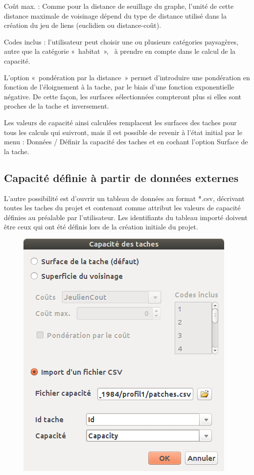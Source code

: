 \documentclass{article}
\begin{document}
Coût max. : Comme pour la distance de seuillage du graphe, l’unité de cette distance maximale de voisinage dépend du type de distance utilisé dans la création du jeu de liens (euclidien ou distance-coût).

Codes inclus : l’utilisateur peut choisir une ou plusieurs catégories paysagères, autre que la catégorie «~habitat~», ~à prendre en compte dans le calcul de la capacité. 

L’option «~pondération par la distance~» permet d’introduire une pondération en fonction de l’éloignement à la tache, par le biais d’une fonction exponentielle négative. De cette façon, les surfaces sélectionnées compteront plus si elles sont proches de la tache et inversement.

Les valeurs de capacité ainsi calculées remplacent les surfaces des taches pour tous les calculs qui suivront, mais il est possible de revenir à l’état initial par le menu : Données / Définir la capacité des taches et en cochant l'option Surface de la tache.

\subsection{Capacité définie à partir de données externes}

L'autre possibilité est d'ouvrir un tableau de données au format *.csv, décrivant toutes les taches du projet et contenant comme attribut les valeurs de capacité définies au préalable par l’utilisateur. Les identifiants du tableau importé doivent être ceux qui ont été définis lors de la création initiale du projet.

\begin{figure}[H]
	\includegraphics[scale=0.5]{img/manual-fr_img9.png} 
\end{figure}
\end{document}
